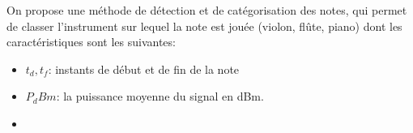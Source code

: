 On propose une méthode de détection et de catégorisation des notes, qui permet de classer l'instrument sur lequel la note est jouée (violon, flûte, piano) dont les caractéristiques sont les suivantes: 
\begin{itemize}
  \item $t_d,t_f$: instants de début et de fin de la note
  \item $P_dBm$: la puissance moyenne du signal en dBm.
  \item 
\end{itemize}
